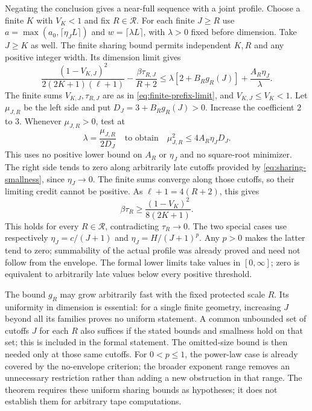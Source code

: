 \begin{outline}
Negating the conclusion gives a near-full sequence with a joint profile.
Choose a finite $K$ with $V_K<1$ and fix $R\in\mathcal R$.
For each finite $J\ge R$ use
$a=\max(a_0,\lceil\eta_J L\rceil)$ and
$w=\lceil\lambda L\rceil$, with $\lambda>0$ fixed before dimension.
Take $J\ge K$ as well. The finite sharing bound permits independent
$K,R$ and any positive integer width. Its dimension limit gives
\begin{equation}\label{eq:sharing-prefix-limit}
 \frac{(1-V_{K,J})^2}{2(2K+1)(\ell+1)}
 -\frac{\beta\tau_{R,J}}{R+2}
 \le \lambda[2+B_Rg_R(J)]+\frac{A_R\eta_J}\lambda.
\end{equation}
The finite sums $V_{K,J},\tau_{R,J}$ are as in
\cref{eq:finite-prefix-limit}, and $V_{K,J}\le V_K<1$.
Let $\mu_{J,R}$ be the left side and put $D_J=3+B_Rg_R(J)>0$.
Increase the coefficient $2$ to $3$. Whenever $\mu_{J,R}>0$, test at
\[
 \lambda=\frac{\mu_{J,R}}{2D_J}
 \quad\text{to obtain}\quad
 \mu_{J,R}^2\le4A_R\eta_JD_J.
\]
This uses no positive lower bound on $A_R$ or $\eta_J$ and no square-root
minimizer. The right side tends to zero along arbitrarily late cutoffs
provided by \cref{eq:sharing-smallness}, since $\eta_J\to0$.
The finite sums converge along those cutoffs, so their limiting
credit cannot be positive. As $\ell+1=4(R+2)$, this gives
\[
 \beta\tau_R\ge\frac{(1-V_K)^2}{8(2K+1)}.
\]
This holds for every $R\in\mathcal R$, contradicting
$\tau_R\to0$. The two special cases use respectively
$\eta_J=c/(J+1)$ and $\eta_J=H/(J+1)^p$.
Any $p>0$ makes the latter tend to zero; summability of the actual
profile was already proved and need not follow from the envelope.
The formal lower limits take values in $[0,\infty]$; zero is equivalent
to arbitrarily late values below every positive threshold.
\end{outline}

The bound $g_R$ may grow arbitrarily fast with the fixed protected
scale $R$. Its uniformity in dimension is essential: for a single
finite geometry, increasing $J$ beyond all its families proves no
uniform statement. A common unbounded set of cutoffs $J$ for each $R$
also suffices if the stated bounds and smallness hold on that set;
this is included in the formal statement. The omitted-size bound is
then needed only at those same cutoffs. For $0<p\le1$, the power-law
case is already covered by the no-envelope criterion; the broader
exponent range removes an unnecessary restriction rather than adding
a new obstruction in that range. The theorem requires these uniform
sharing bounds as hypotheses; it does not establish them for arbitrary
tape computations.

